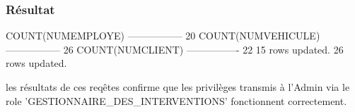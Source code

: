 \documentclass[•]{article}
\begin{document}
\subsubsection{Résultat}
\begin{sql}
COUNT(NUMEMPLOYE)
-----------------
			   20
COUNT(NUMVEHICULE)
-----------------
				26
COUNT(NUMCLIENT)
----------------
			  22
15 rows updated.
26 rows updated.
			  
\end{sql}

\textrm{les résultats de ces reqêtes confirme que les privilèges transmis à l'Admin via le role 'GESTIONNAIRE\_DES\_INTERVENTIONS' fonctionnent correctement.}
\end{document}
